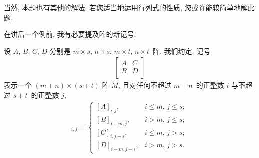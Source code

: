 
当然, 本题也有其他的解法.
若您适当地运用行列式的性质,
您或许能较简单地解此题.

\vspace{2ex}

在讲后一个例前,
我有必要提及阵的新记号.

\begin{definition}
    设 \(A\), \(B\), \(C\), \(D\)
    分别是 \(m \times s\), \(n \times s\),
    \(m \times t\), \(n \times t\)~阵.
    我们约定, 记号
    \begin{align*}
        \begin{bmatrix}
            A & C \\
            B & D \\
        \end{bmatrix}
    \end{align*}
    表示一个 \((m + n) \times (s + t)\)-阵 \(M\),
    且对任何不超过 \(m + n\)~的正整数 \(i\)
    与不超过 \(s + t\)~的正整数 \(j\),
    \begin{align*}
        [M]_{i,j}
        = \begin{cases}
              [A]_{i,j},
               & \text{\(i \leq m\), \(j \leq s\)}; \\
              [B]_{i-m,j},
               & \text{\(i > m\), \(j \leq s\)};    \\
              [C]_{i,j-s},
               & \text{\(i \leq m\), \(j > s\)};    \\
              [D]_{i-m,j-s},
               & \text{\(i > m\), \(j > s\)}.
          \end{cases}
    \end{align*}
\end{definition}


